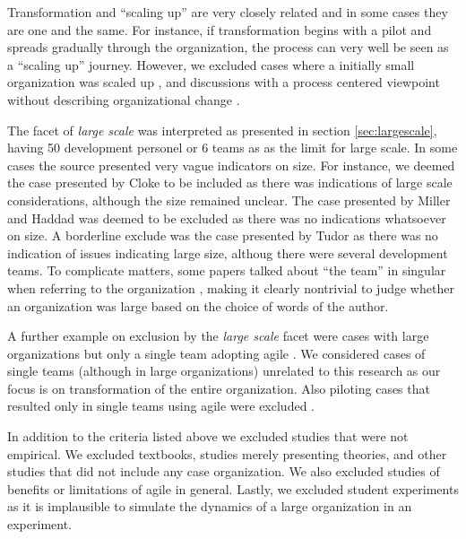 \documentclass[preprint,authoryear,12pt]{elsarticle}
\begin{document}
Transformation and ``scaling up'' are very closely related and in some cases
they are one and the same. For instance, if transformation begins with a pilot
and spreads gradually through the organization, the process can very well be
seen as a ``scaling up'' journey. However, we excluded cases where a initially
small organization was scaled up \cite{Maranzato2012}, and discussions with a
process centered viewpoint without describing organizational change
\cite{Lyon2008}.

The facet of \emph{large scale} was interpreted as presented in section
\ref{sec:largescale}, having 50 development personel or 6 teams as as the limit
for large scale. In some cases the source presented very vague indicators on
size. For instance, we deemed the case presented by Cloke \cite{Cloke2007} to be
included as there was indications of large scale considerations, although the
size remained unclear. The case presented by Miller and Haddad \cite{Miller2012}
was deemed to be excluded as there was no indications whatsoever on size. A
borderline exclude was the case presented by Tudor \cite{Tudor2006} as there was
no indication of issues indicating large size, althoug there were several
development teams.
To complicate matters, some papers talked about ``the team'' in singular when
referring to the organization \cite{Hodgkins2007}, making it clearly nontrivial
to judge whether an organization was large based on the choice of words of the
author.

A further example on exclusion by the \emph{large scale} facet were cases with
large organizations but only a single team adopting agile \cite{Fulgham2011}.
We considered cases of single teams (although in large organizations) unrelated
to this research as our focus is on transformation of the entire organization.
Also piloting cases that resulted only in single teams using agile were excluded
\cite{Scott2008}.


In addition to the criteria listed above we excluded studies that were not
empirical. We excluded textbooks, studies merely presenting theories, and other
studies that did not include any case organization. We also excluded studies of
benefits or limitations of agile in general. Lastly, we excluded student
experiments as it is implausible to simulate the dynamics of a large
organization in an experiment.
\end{document}
